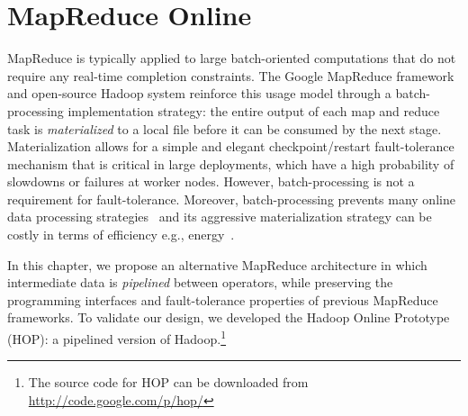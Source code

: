 \chapter[MapReduce Online]{MapReduce Online}
\label{ch:hop}

MapReduce is typically applied to large batch-oriented computations that do not
require any real-time completion constraints.  The Google MapReduce
framework~\cite{mapreduce-osdi} and open-source Hadoop system reinforce this
usage model through a batch-processing implementation strategy: the entire
output of each map and reduce task is {\em materialized} to a local file
before it can be consumed by the next stage.  Materialization allows for a
simple and elegant checkpoint/restart fault-tolerance mechanism that is
critical in large deployments, which have a high probability of slowdowns or
failures at worker nodes.  However, batch-processing is not a requirement for
fault-tolerance.  Moreover, batch-processing prevents many online data
processing strategies~\cite{onlineagg, borealis, stream, tcq-cidr} and its
aggressive materialization strategy can be costly in terms of efficiency e.g.,
energy~\cite{yanpei}.

In this chapter, we propose an alternative MapReduce architecture in which
intermediate data is {\em pipelined} between operators, while preserving the
programming interfaces and fault-tolerance properties of previous MapReduce
frameworks.  To validate our design, we developed the Hadoop Online Prototype
(HOP): a pipelined version of Hadoop.\footnote{The source code for HOP can be
downloaded from \url{http://code.google.com/p/hop/}}

